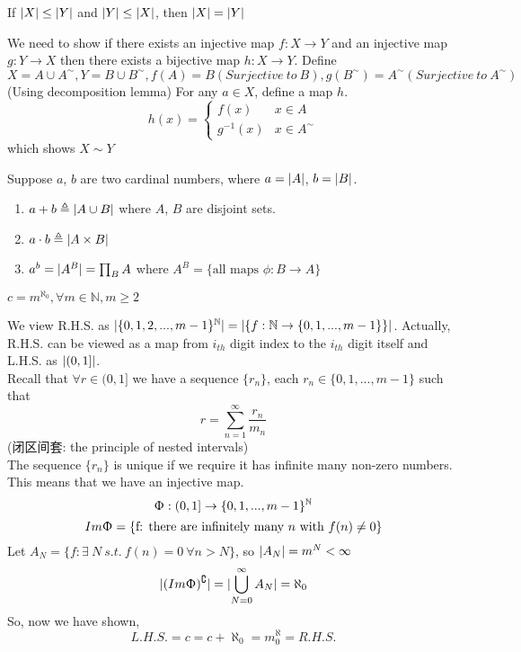 \begin{myTheo}
	If $\lvert X\rvert\leq\lvert Y\rvert$ and $\lvert Y\rvert\leq\lvert X\rvert$, then $\lvert X\rvert=\lvert Y\rvert$
\end{myTheo}
\begin{myPf}
	We need to show if there exists an injective map $f: X\rightarrow Y$ and an injective map $g: Y\rightarrow X$ then there exists a bijective map $h: X\rightarrow Y$.
	\newline
	\newline
	Define $X=A\cup A^\sim, Y=B\cup B^\sim, f(A)=B(Surjective\ to\ B), g(B^\sim)=A^\sim(Surjective\ to\ A^\sim)$(Using decomposition lemma)
	\newline
	For any $a\in X$, define a map $h$.
	\[
	h(x)=\left.
	\begin{cases}
	f(x) & x\in A\\
	g^{-1}(x) & x\in A^\sim
	\end{cases}
	\right.
	\]
	which shows $X\sim Y$
\end{myPf}
\begin{myDef}
	Suppose $a$, $b$ are two cardinal numbers, where $a=\lvert A\rvert$, $b=\lvert B\rvert$.
	\begin{enumerate}
		\item $a+b\triangleq\lvert A\cup B\rvert$ where $A$, $B$ are disjoint sets.
		\item $a\cdot b\triangleq \lvert A\times B\rvert$
		\item $a^b=\lvert A^B\rvert=\prod_{B}A$ where $A^B=\{\text{all maps }\phi: B\rightarrow A\}$
	\end{enumerate}
\end{myDef}
\begin{myProp}
	$c=m^{\aleph_0}, \forall m\in \mathbb{N}, m\geq2$
\end{myProp}
\begin{myPf}
	We view R.H.S. as $\lvert\{0,1,2,...,m-1\}^{\mathbb{N}}\rvert=\lvert\{f:\mathbb{N}\rightarrow\{0,1,...,m-1\}\}\rvert$. Actually, R.H.S. can be viewed as a map from $i_{th}$ digit index to the $i_{th}$ digit itself and L.H.S. as $\lvert(0,1]\rvert$.
	\\
	Recall that $\forall r \in (0,1]$ we have a sequence $\{r_n\}$, each $r_n\in\{0,1,...,m-1\}$ such that
	\[r=\sum_{n=1}^{\infty}\frac{r_n}{m_n}\]
	(闭区间套: the principle of nested intervals)
	\\
	The sequence $\{r_n\}$ is unique if we require it has infinite many non-zero numbers.
	\\
	This means that we have an injective map.
	\[\Upphi: (0,1] \rightarrow \{0,1,...,m-1\}^\mathbb{N}\]
	\[Im\Upphi=\{\text{f: there are infinitely many $n$ with $f(n)\neq0$}\}\]
	Let $A_N=\{f:\exists\ N\ s.t.\ f(n)=0\ \forall n>N\}$, so $\lvert A_N\rvert=m^N<\infty$
	\[\lvert(Im\Upphi)^\complement\rvert=\lvert\bigcup_{N=0}^\infty A_N\rvert=\aleph_0\]
	So, now we have shown,
	\[L.H.S.=c=c+\aleph_0=m^\aleph_0=R.H.S.\]
\end{myPf}
